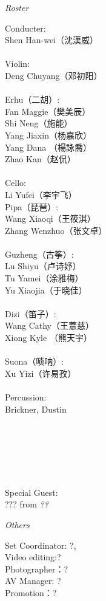\documentclass[letter,6pt,poets]{ConcProg}
\begin{document}
\begin{spacing}{1.0}
\begin{center}
\Large\textsl{ Roster}
\end{center}
\begin{multicols}{2}%
Conducter:\\
Shen  Han-wei（沈漢威）
\\
\\
Violin:\\
Deng  Chuyang（邓初阳）\\
\\
Erhu（二胡）:     \\     
Fan  Maggie（樊美辰）\\
Shi Neng（施能）\\
Yang  Jiaxin（杨嘉欣）\\
Yang  Dana （楊詠喬）\\
Zhao  Kan（赵侃）\\
\\
Cello:\\
Li  Yufei（李宇飞）\\

Pipa（琵琶）:\\
Wang Xiaoqi（王筱淇）\\
Zhang  Wenzhuo（张文卓）\\
\\
Guzheng（{古筝}）:\\
Lu  Shiyu（卢诗妤）\\
Tu  Yamei（涂雅梅）\\
Yu Xiaojia（于晓佳）
\\
\\
Dizi（笛子）: 				 \\
Wang  Cathy（王薏慈）\\
Xiong  Kyle （熊天宇）\\
\\
Suona（唢呐）:\\
Xu  Yizi（许易孜）
\\
\\
Percussion:\\
Brickner, Dustin
\\
\\
\\
\\
\\
\\
\\
Special Guest:\\
??? 
 \footnotesize{ from } \emph{ ??}
\\
\end{multicols}
\begin{center}
\Large\textsl{ Others}
\end{center}
\begin{multicols}{2}%
 Set Coordinator: ?,\\ 
 Video editing:? \\
Photographer：?\\
AV Manager: ?\\
Promotion：?\\
\\



\end{multicols}
\end{spacing}
\end{document}
